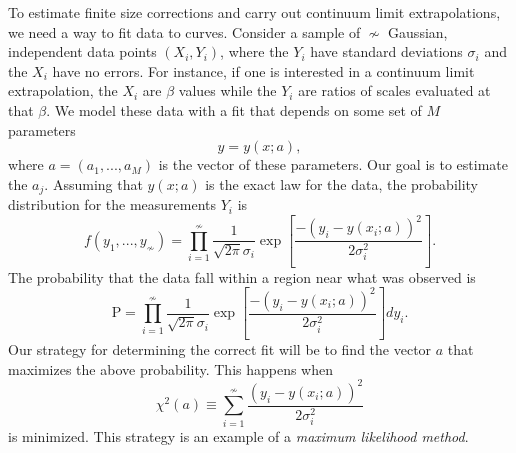 To estimate finite size corrections and carry out continuum limit
extrapolations, we need a way to fit data to curves.
Consider a sample of $\nsim$ Gaussian, independent data points $(X_i,Y_i)$,
where the $Y_i$ have standard deviations $\sigma_i$ and the $X_i$ have
no errors. For instance, if one is interested in a continuum limit
extrapolation, the $X_i$ are $\beta$ values while the $Y_i$ are
ratios of scales evaluated at that $\beta$.
We model these data with a fit that depends on some set
of $M$ parameters
\begin{equation}
  y=y(x;a),
\end{equation}
where $a=(a_1,...,a_M)$ is the vector of these parameters. Our goal
is to estimate the $a_j$.
Assuming that $y(x;a)$ is the exact law for the data, the probability
distribution for the measurements $Y_i$ is 
\begin{equation}
  f(y_1,...,y_{\nsim})=\prod_{i=1}^{\nsim}\frac{1}{\sqrt{2\pi}\sigma_i}
      \exp\left[\frac{-(y_i-y(x_i;a))^2}{2\sigma_i^2}\right].
\end{equation}
The probability that the data fall within a region near what was observed is
\begin{equation}
  \text{P}=\prod_{i=1}^{\nsim}\frac{1}{\sqrt{2\pi}\sigma_i}
      \exp\left[\frac{-(y_i-y(x_i;a))^2}{2\sigma_i^2}\right]dy_i.
\end{equation}
Our strategy for determining the correct fit will be to find the vector $a$
that maximizes the above probability. This happens when
\begin{equation}
  \chi^2(a)\equiv\sum_{i=1}^{\nsim}\frac{(y_i-y(x_i;a))^2}{2\sigma_i^2}
\end{equation}
is minimized. This strategy is an example of a {\it maximum likelihood method}.

